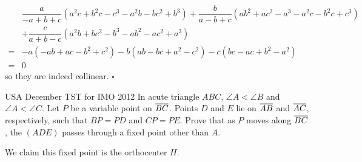 \documentclass{article}
\begin{document}
\begin{align*}
&\dfrac{a}{-a+b+c}(a^2c+b^2c-c^3-a^2b-bc^2+b^3)+\dfrac{b}{a-b+c}(ab^2+ac^2-a^3-a^2c-b^2c+c^3) \\
&+\dfrac{c}{a+b-c}(a^2b+bc^2-b^3-ab^2-ac^2+a^3) \\
= &-a(-ab+ac-b^2+c^2)-b(ab-bc+a^2-c^2)-c(bc-ac+b^2-a^2) \\
= &0
\end{align*}
so they are indeed collinear. $\square$
\begin{problem}[7.43]{USA December TST for IMO 2012}
In acute triangle $ABC$, $\angle A < \angle B$ and $\angle A < \angle C$. Let $P$ be a variable point on $\overline{BC}$. Points $D$ and $E$ lie on $\overline{AB}$ and $\overline{AC}$, respectively, such that $BP = PD$ and $CP = PE$. Prove that as $P$ moves along $\overline{BC}$, the $(ADE)$ passes through a fixed point other than $A$.
\end{problem}
We claim this fixed point is the orthocenter $H$.
\end{document}
